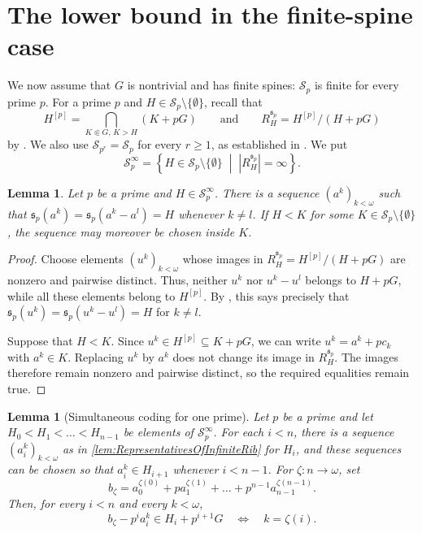 \documentclass{article}
\theoremstyle{definition}
\theoremstyle{remark}
\theoremstyle{plain}
\newtheorem{lem}[dfn]{Lemma}
\begin{document}
\section{The lower bound in the finite-spine case}

We now assume that $G$ is nontrivial and has finite spines: $\mathcal{S}_p$ is finite for every prime $p$.
For a prime $p$ and $H\in\mathcal{S}_p\setminus\{\emptyset\}$, recall that
\[
	H^{[p]}=\bigcap_{K\Subset G,\,K>H}(K+pG)
	\qquad\text{and}\qquad
	R_H^{\mathfrak{s}_p}
	=
	H^{[p]}/(H+pG)
\]
by \cite[Definition 2.10 and Lemma 2.14(1)]{Okura2026DisOrd}.
We also use $\mathcal{S}_{p^r}=\mathcal{S}_p$ for every $r\geq 1$, as established in \cite[Lemma 2.2(1)]{Cluckers2011QuaEli}.
We put
\[
	\mathcal{S}_p^\infty
	=
	\left\{
		H\in\mathcal{S}_p\setminus\{\emptyset\}
		\;\middle|\;
		\left|R_H^{\mathfrak{s}_p}\right|=\infty
	\right\}.
\]

\begin{lem}\label{lem:RepresentativesOfInfiniteRib}
	Let $p$ be a prime and $H\in\mathcal{S}_p^\infty$.
	There is a sequence $(a^k)_{k<\omega}$ such that $\mathfrak{s}_p(a^k)=\mathfrak{s}_p(a^k-a^l)=H$ whenever $k\neq l$.
	If $H<K$ for some $K\in\mathcal{S}_p\setminus\{\emptyset\}$, the sequence may moreover be chosen inside $K$.
\end{lem}

\begin{proof}
	Choose elements $(u^k)_{k<\omega}$ whose images in $R_H^{\mathfrak{s}_p}=H^{[p]}/(H+pG)$ are nonzero and pairwise distinct.
	Thus, neither $u^k$ nor $u^k-u^l$ belongs to $H+pG$, while all these elements belong to $H^{[p]}$.
	By \cite[Lemma 2.14(1)]{Okura2026DisOrd}, this says precisely that $\mathfrak{s}_p(u^k)=\mathfrak{s}_p(u^k-u^l)=H$ for $k\neq l$.

	Suppose that $H<K$.
	Since $u^k\in H^{[p]}\subseteq K+pG$, we can write $u^k=a^k+pc_k$ with $a^k\in K$.
	Replacing $u^k$ by $a^k$ does not change its image in $R_H^{\mathfrak{s}_p}$.
	The images therefore remain nonzero and pairwise distinct, so the required equalities remain true.
\end{proof}

\begin{lem}[Simultaneous coding for one prime]\label{lem:SimultaneousCodingOnePrime}
	Let $p$ be a prime and let $H_0<H_1<\dots<H_{n-1}$ be elements of $\mathcal{S}_p^\infty$.
	For each $i<n$, there is a sequence $(a_i^k)_{k<\omega}$ as in \autoref{lem:RepresentativesOfInfiniteRib} for $H_i$, and these sequences can be chosen so that $a_i^k\in H_{i+1}$ whenever $i<n-1$.
	For $\zeta:n\to\omega$, set
	\[
		b_\zeta
		=
		a_0^{\zeta(0)}+pa_1^{\zeta(1)}+\dots+p^{n-1}a_{n-1}^{\zeta(n-1)}.
	\]
	Then, for every $i<n$ and every $k<\omega$,
	\[
		b_\zeta-p^ia_i^k\in H_i+p^{i+1}G
		\quad\Longleftrightarrow\quad
		k=\zeta(i).
	\]
\end{lem}
\end{document}
